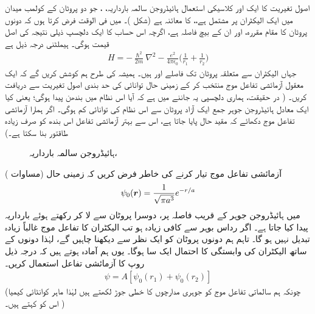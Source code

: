  اصول تغیریت کا ایک اور کلاسیکی استعمال ہائیڈروجن سالمہ بارداریہ، ، جو دو پروٹان کے کولمب میدان میں ایک الیکٹران پر مشتمل ہے،، کا معائنہ ہے (شکل )۔ میں فی الوقت فرض کرتا ہوں کہ دونوں پروٹان کا مقام مقررہ، اور ان کے بیچ فاصلہ  ہے، اگرچہ اس حساب کا ایک دلچسپ ذیلی نتیجہ  کی اصل قیمت ہوگی۔ ہیملٹنی درجہ ذیل ہے
 \begin{align}\label{مساوات_تغیریت_ہائیڈروجن_ہیملٹنی}
H=-\frac{\hslash^{2}}{2m}\nabla^{2}-\frac{e^{2}}{4\pi\epsilon_{0}}\big(\frac{1}{r_{1}}+\frac{1}{r_{2}}\big)
\end{align}
 جہاں الیکٹران سے متعلقہ پروٹان تک فاصلے  اور ہیں۔ ہمیشہ کی طرح ہم کوشش کریں گے کہ ایک معقول آزمائشی تفاعل موج منتخب کر کے زمینی حال توانائی کی حد بندی اصول تغیریت سے دریافت کریں۔ ( در حقیقت، ہماری دلچسپی یہ جاننے میں ہے کہ آیا اس نظام میں بندھن پیدا ہوگی؛ یعنی کیا ایک معادل ہائیڈروجن جوہر جمع ایک آزاد پروٹان سے اس نظام کی توانائی کم ہوگی۔ اگر ہمارا آزمائشی تفاعل موج دکھائے کہ مقید حال پایا جاتا ہے، اس سے بہتر آزمائشی تفاعل اس بندھ کو صرف زیادہ طاقتور بنا سکتا ہے۔)
\begin{figure} \centering
{} 
\caption{ہائیڈروجن سالمہ بارداریہ، } 
\label{شکل_تغیریت_ہائیڈروجن_سالمہ_بارداریہ} 
\end{figure} 

 آزمائشی تفاعل موج تیار کرنے کی خاطر فرض کریں کہ زمینی حال (مساوات )
\begin{align}
\psi_{0}({{\boldsymbol{r}}})=\frac{1}{\sqrt{\pi a^{3}}}e^{-r/a} 
\end{align}
 میں ہائیڈروجن جوہر کے قریب فاصلہ  پر، دوسرا پروٹان  سے لا کر رکھتے ہوئے بارداریہ پیدا کیا جاتا ہے۔ اگر رداس بوہر سے  کافی زیادہ ہو تب الیکٹران کا تفاعل موج غالباً زیادہ تبدیل نہیں ہو گا۔ تاہم ہم دونوں پروٹان کو ایک نظر سے دیکھنا چاہیں گے، لہٰذا دونوں کے ساتھ الیکٹران کی وابستگی کا احتمال ایک سا ہوگا۔ یوں ہم آمادہ ہوتے ہیں کہ درجہ ذیل روپ کا آزمائشی تفاعل استعمال کریں۔ 
 \begin{align}\label{مساوات_تغیریت_آزمائشی_تفاعل}
\psi=A[\psi_{0}(r_{1})+\psi_{0}(r_{2})]
\end{align}
(چونکہ ہم سالماتی تفاعل موج کو جوہری مدارچوں کا خطی جوڑ لکھتے ہیں لہٰذا ماہر کوانٹائی کیمیا اس کو  کہتے ہیں۔ )

